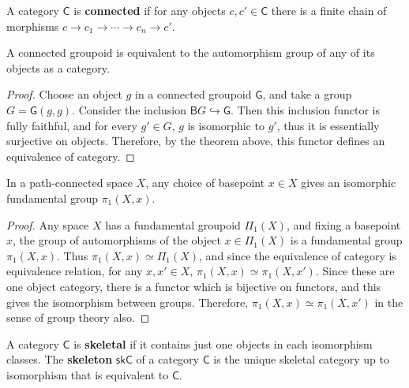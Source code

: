 \begin{defn} A category $\mathsf{C}$ is \textbf{connected} if for any objects $c,c'\in \mathsf{C}$ there is a finite chain of morphisms $c\rightarrow c_1\rightarrow \cdots\rightarrow c_n\rightarrow c'$.
\end{defn}

\begin{prop} A connected groupoid is equivalent to the automorphism group of any of its objects as a category.
\end{prop}
\begin{proof} Choose an object $g$ in a connected groupoid $\mathsf{G}$, and take a group $G=\mathsf{G}(g,g)$. Consider the inclusion $\mathsf{B}G\hookrightarrow \mathsf{G}$. Then this inclusion functor is fully faithful, and for every $g'\in G$, $g$ is isomorphic to $g'$, thus it is essentially surjective on objects. Therefore, by the theorem above, this functor defines an equivalence of category.
\end{proof}

\begin{cor} In a path-connected space $X$, any choice of basepoint $x\in X$ gives an isomorphic fundamental group $\pi_1(X,x)$.
\end{cor}
\begin{proof}
Any space $X$ has a fundamental groupoid $\Pi_1(X)$, and fixing a basepoint $x$, the group of automorphisms of the object $x\in\Pi_1(X)$ is a fundamental group $\pi_1(X,x)$. Thus $\pi_1(X,x)\simeq \Pi_1(X)$, and since the equivalence of category is equivalence relation, for any $x,x'\in X$, $\pi_1(X,x)\simeq \pi_1(X,x')$. Since these are one object category, there is a functor which is bijective on functors, and this gives the isomorphism between groups. Therefore, $\pi_1(X,x)\simeq \pi_1(X,x')$ in the sense of group theory also.
\end{proof}

\begin{defn} A category $\mathsf{C}$ is \textbf{skeletal} if it contains just one objects in each isomorphism classes. The \textbf{skeleton} $\mathsf{skC}$ of a category $\mathsf{C}$ is the unique skeletal category up to isomorphism that is equivalent to $\mathsf{C}$. 
\end{defn}


